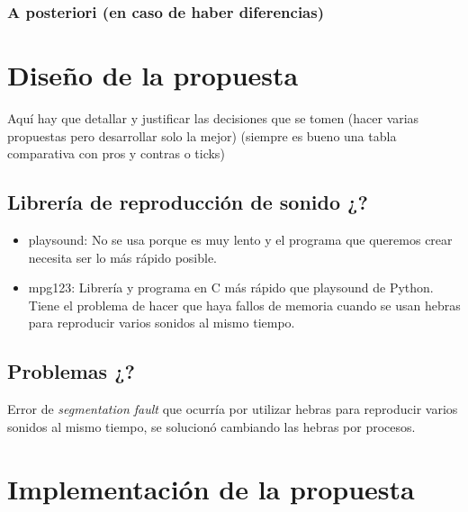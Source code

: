 \documentclass{article}
\begin{document}
 \subsubsection{A posteriori (en caso de haber diferencias)} 
 
 

\section{Diseño de la propuesta}\label{sec:Diseno}

 Aquí hay que detallar y justificar las decisiones que se tomen (hacer varias propuestas pero desarrollar solo la mejor) (siempre es bueno una tabla comparativa con pros y contras o ticks)
 
 \subsection{Librería de reproducción de sonido ¿?}
 \begin{itemize}
     \item playsound\cite{playsound}: No se usa porque es muy lento y el programa que queremos crear necesita ser lo más rápido posible.
     \item mpg123\cite{mpg123}: Librería y programa en C más rápido que playsound de Python. Tiene el problema de hacer que haya fallos de memoria cuando se usan hebras para reproducir varios sonidos al mismo tiempo.
 \end{itemize} 
 
 \subsection{Problemas ¿?}
 Error de \textit{segmentation fault} que ocurría por utilizar hebras para reproducir varios sonidos al mismo tiempo, se solucionó cambiando las hebras por procesos.
 
\section{Implementación de la propuesta}\label{sec:Implementacion}
\end{document}
